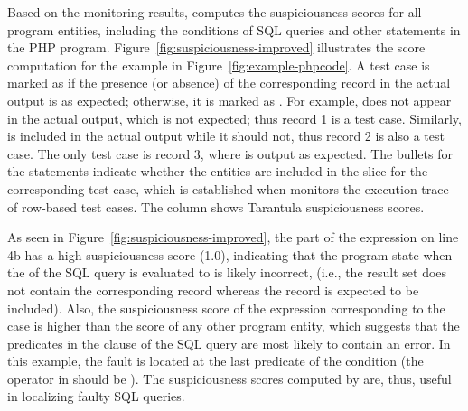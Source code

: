 Based on the monitoring results, \tool{} computes the suspiciousness
scores for all program entities, including the 
conditions of SQL queries and other statements in the PHP
program. Figure~\ref{fig:suspiciousness-improved} illustrates the
score computation for the example in
Figure~\ref{fig:example-phpcode}. A test case is marked as
 if the presence (or absence) of the
corresponding record in the actual output is as expected; otherwise,
it is marked as . For example,  does not
appear in the actual output, which is not expected; thus record 1 is a
 test case. Similarly,  is included in the
actual output while it should not, thus record 2 is also a
 test case. The only  test case is record 3,
where  is output as expected. The bullets for the 
statements indicate whether the entities are included in the slice for
the corresponding test case, which is established when \tool{}
monitors the execution trace of row-based test cases. 
The column  shows Tarantula suspiciousness scores. 



As seen in Figure~\ref{fig:suspiciousness-improved}, the 
part of the  expression on line 4b has a high
suspiciousness score (1.0), indicating that the program state when the
 of the SQL query is evaluated to  is likely
incorrect, (i.e., the result set does not contain the corresponding
record whereas the record is expected to be included). Also, the
suspiciousness score of the
 expression corresponding to the  case is
higher than the score of any other program entity, which suggests that
the predicates in the  clause of the SQL query are most
likely to contain an error. In this example, the fault is located at
the last predicate of the  condition (the operator in
 should be
). 
The suspiciousness scores computed by \tool{} are, thus, useful in
localizing faulty SQL queries.  

